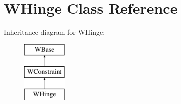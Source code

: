 \hypertarget{class_w_hinge}{}\section{W\+Hinge Class Reference}
\label{class_w_hinge}
Inheritance diagram for W\+Hinge\+:\begin{figure}[H]
\begin{center}
\leavevmode
\includegraphics[height=3.000000cm]{class_w_hinge}
\end{center}
\end{figure}
